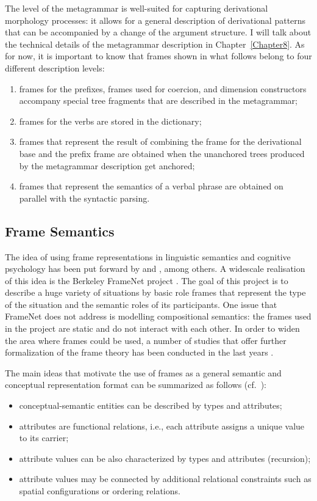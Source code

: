 The level of the metagrammar is well-suited for capturing derivational morphology processes: it allows for a general description of derivational patterns that can be accompanied by a change of the argument structure. I will talk about the technical details of the metagrammar description in Chapter~\ref{Chapter8}. As for now, it is important to know that frames shown in what follows belong to four different description levels: 
\begin{enumerate}
\item frames for the prefixes, frames used for coercion, and dimension constructors accompany special tree fragments that are described in the metagrammar; 
\item frames for the verbs are stored in the dictionary; 
\item frames that represent the result of combining the frame for the derivational base and the prefix frame are obtained when the unanchored trees produced by the metagrammar description get anchored; 
\item frames that represent the semantics of a verbal phrase are obtained on parallel with the syntactic parsing.
\end{enumerate}

\subsection{Frame Semantics}
The idea of using frame representations in linguistic semantics and cognitive
psychology has been put forward by \citet{Fillmore:82} and
\citet{Barsalou:92}, among others. A widescale realisation of this idea is the Berkeley FrameNet project \citep{Fillmore:03}. The goal of this project is to describe a huge variety of situations by basic role frames that represent the type of the situation and the semantic roles of its participants. One issue that FrameNet does not address is modelling compositional semantics: the frames used in the project are static and do not interact with each other. In order to widen the area where frames could be used, a number of studies that offer further formalization of the frame theory has been conducted in the last years \citep[][among others]{Petersen:07, PetersenOsswald:10, KallmeyerOsswald:12, KallmeyerOsswald:13, KallmeyerOsswaldPogodalla:15, Loebner:2014}.

The main ideas that motivate the use of frames as a general semantic and conceptual representation format can be summarized as follows (cf.\ \citealt{Loebner:2014}):
\begin{itemize}
\item conceptual-semantic entities can be described by types and
attributes;
\item attributes are functional relations, i.e., each attribute assigns a unique
value to its carrier;
\item attribute values can be also characterized by types and attributes (recursion);
\item attribute values may be connected by additional relational constraints \citep{Barsalou:92} such as spatial configurations or ordering relations.
\end{itemize}

